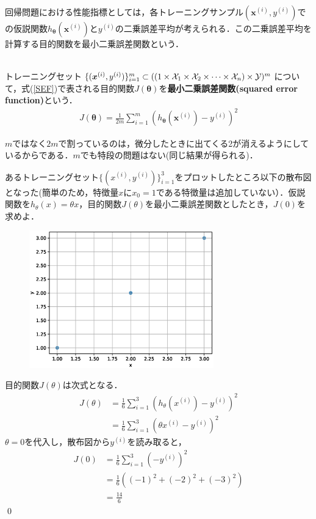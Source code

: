 回帰問題における性能指標としては，各トレーニングサンプル$({\bm x}^{(i)},y^{(i)})$での仮説関数$h_{{\bm \theta}}({\bm x}^{(i)})$と$y^{(i)}$の二乗誤差平均が考えられる．この二乗誤差平均を計算する目的関数を最小二乗誤差関数という．

\begin{defi}[最小二乗誤差関数]
　\\
トレーニングセット$\{({\bm x}^{(i)},y^{(i)})\}_{i=1}^m \subset ((1 \times {\cal X}_1 \times {\cal X}_2\times \cdots \times{\cal X}_n) \times {\cal Y})^m$について，式(\ref{SEF})で表される目的関数$J({\bm \theta})$を{\bf 最小二乗誤差関数(squared error function)}という．
\begin{align}
J({\bm \theta}) = \frac{1}{2m}\sum_{i=1}^m (h_{{\bm \theta}}({\bm x}^{(i)})-y^{(i)})^2 \label{SEF}
\end{align}
\end{defi}

\begin{rem}
$m$ではなく$2m$で割っているのは，微分したときに出てくる2が消えるようにしているからである．$m$でも特段の問題はない(同じ結果が得られる)．
\end{rem}

\begin{qu}
あるトレーニングセット$\{(x^{(i)},y^{(i)})\}_{i=1}^3$をプロットしたところ以下の散布図となった(簡単のため，特徴量$x$に$x_0=1$である特徴量は追加していない）．仮説関数を$h_{\theta}(x)=\theta x$，目的関数$J(\theta)$を最小二乗誤差関数としたとき，$J(0)$を求めよ．
\vspace{-10pt}
\begin{figure}[H]
\begin{center}
\includegraphics[width=8.0cm]{code/lrfig1.eps}
\end{center}
\end{figure}
\vspace{-25pt}
\end{qu}
\begin{ans}
目的関数$J(\theta)$は次式となる．
\begin{align*}
J(\theta)&=\frac{1}{6}\sum_{i=1}^3 (h_{\theta}(x^{(i)})-y^{(i)})^2 \\
&=\frac{1}{6}\sum_{i=1}^3 (\theta x^{(i)}-y^{(i)})^2
\end{align*}
$\theta =0$を代入し，散布図から$y^{(i)}$を読み取ると，
\begin{align*}
J(0)&=\frac{1}{6}\sum_{i=1}^3 (-y^{(i)})^2 \\
&=\frac{1}{6}((-1)^2+(-2)^2+(-3)^2) \\
&= \frac{14}{6}
\end{align*}
\qed
\end{ans}

